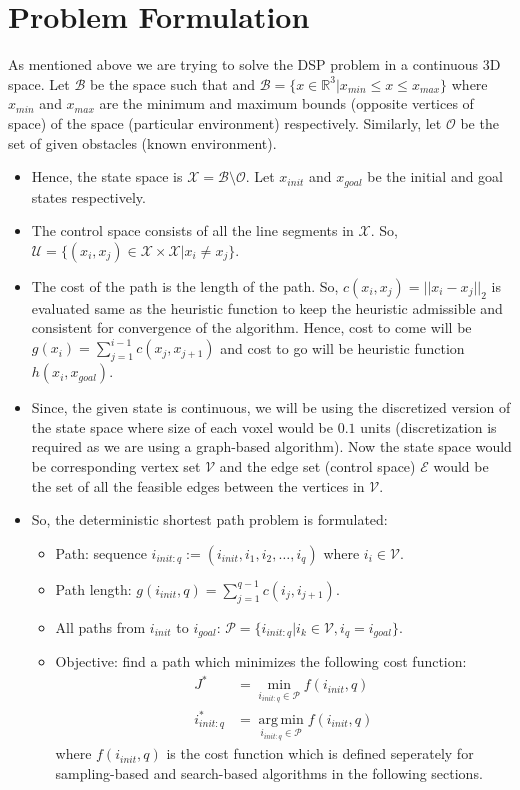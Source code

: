 \documentclass[conference]{IEEEtran}
\begin{document}
\section{Problem Formulation}
\label{sec:formulation}
As mentioned above we are trying to solve the DSP problem in a continuous 3D space. Let $\mathcal{B}$ be the space such that
and $\mathcal{B} = \{x \in \mathbb{R}^3 | x_{min} \leq x \leq x_{max}\}$ where $x_{min}$ and $x_{max}$ are the minimum and maximum bounds (opposite vertices of space) of the space (particular environment) respectively.
Similarly, let $\mathcal{O}$ be the set of given obstacles (known environment). 
\begin{itemize}
\item Hence, the state space is $\mathcal{X} = \mathcal{B} \setminus \mathcal{O}$. Let $x_{init}$ and $x_{goal}$ be the initial and goal states respectively. 
\item The control space consists of all the line segments in $\mathcal{X}$. So, $\mathcal{U} = \{(x_i, x_j) \in \mathcal{X} \times \mathcal{X} | x_i \neq x_j\}$. 
\item The cost of the path is the length of the path. So, $c(x_i, x_j) = ||x_i - x_j||_2$ is evaluated same as the heuristic function to keep the heuristic admissible and consistent for convergence of the algorithm. Hence, cost to come will be $g(x_i) = \sum_{j=1}^{i-1} c(x_j, x_{j+1})$ and cost to go will be heuristic function $h(x_i, x_{goal})$.
\item Since, the given state is continuous, we will be using the discretized version of the state space where size of each voxel would be $0.1$ units (discretization is required as we are using a graph-based algorithm).
Now the state space would be corresponding vertex set $\mathcal{V}$ and the edge set (control space) $\mathcal{E}$ would be the set of all the feasible edges between the vertices in $\mathcal{V}$.
\item So, the deterministic shortest path problem is formulated:
\begin{itemize}
    \item Path: sequence $i_{init:q} := (i_{init}, i_1, i_2, \dots, i_q)$ where $i_i \in \mathcal{V}$.
    \item Path length: $g(i_{init}, q) = \sum_{j=1}^{q-1} c(i_j, i_{j+1})$.
    \item All paths from $i_{init}$ to $i_{goal}$: $\mathcal{P} = \{i_{init:q} | i_k \in \mathcal{V}, i_q = i_{goal}\}$.
    \item Objective: find a path which minimizes the following cost function:
    \begin{align*}
        J^* &= \min_{i_{init:q} \in \mathcal{P}} f(i_{init}, q) \\
        i_{init:q}^* &= \operatorname*{arg\,min}_{i_{init:q} \in \mathcal{P}} f(i_{init}, q)
    \end{align*}
    where $f(i_{init}, q)$ is the cost function which is defined seperately for sampling-based and search-based algorithms in the following sections.
\end{itemize}
\end{itemize}
\end{document}
